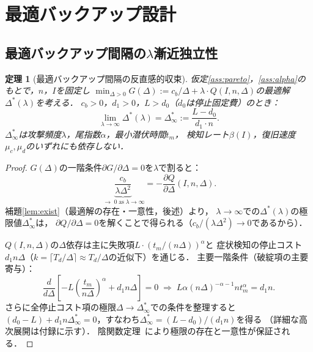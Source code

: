\documentclass[12pt,a4paper]{article}
\theoremstyle{plain}
\newtheorem{theorem}{定理}[section]
\theoremstyle{definition}
\theoremstyle{remark}
\newcommand{\betaI}{\beta(I)}
\newcommand{\Dopt}{\Delta^{*}}
\newcommand{\Dinf}{\Delta^{*}_{\infty}}
\begin{document}
\section{最適バックアップ設計}
\label{sec:opt}

\subsection{最適バックアップ間隔の$\lambda$漸近独立性}

\begin{theorem}[最適バックアップ間隔の反直感的収束]\label{thm:delta_inf}
仮定\ref{ass:pareto}，\ref{ass:alpha}のもとで，$n$，$I$を固定し
$\min_{\Delta>0}G(\Delta):=c_b/\Delta+\lambda\cdot Q(I,n,\Delta)$の最適解$\Dopt(\lambda)$を考える．
$c_b>0$，$d_1>0$，$L>d_0$（$d_0$は停止固定費）のとき：
\begin{equation}\label{eq:delta_inf}
  \lim_{\lambda\to\infty}\Dopt(\lambda)
  = \Dinf
  := \frac{L-d_0}{d_1\cdot n}.
\end{equation}
$\Dinf$は攻撃頻度$\lambda$，尾指数$\alpha$，最小潜伏時間$t_m$，
検知レート$\betaI$，復旧速度$\mu_c,\mu_d$のいずれにも依存しない．
\end{theorem}

\begin{proof}
$G(\Delta)$の一階条件$\partial G/\partial\Delta=0$を$\lambda$で割ると：
\begin{equation}\label{eq:foc_scaled}
  \underbrace{\frac{c_b}{\lambda\Delta^2}}_{\;\to\;0\;\text{as}\;\lambda\to\infty}
  = -\frac{\partial Q}{\partial\Delta}(I,n,\Delta).
\end{equation}
補題\ref{lem:exist}（最適解の存在・一意性，後述）より，
$\lambda\to\infty$での$\Dopt(\lambda)$の極限値$\Dinf$は，
$\partial Q/\partial\Delta=0$を解くことで得られる（$c_b/(\lambda\Delta^2)\to0$であるから）．

$Q(I,n,\Delta)$の$\Delta$依存は主に失敗項$L\cdot(t_m/(n\Delta))^\alpha$と
症状検知の停止コスト$d_1 n\Delta$（$k=\lceil T_d/\Delta\rceil\approx T_d/\Delta$の近似下）を通じる．
主要一階条件（破綻項の主要寄与）：
\[
  \frac{d}{d\Delta}\!\left[-L\left(\frac{t_m}{n\Delta}\right)^\alpha + d_1 n\Delta\right]=0
  \;\Longrightarrow\;
  L\alpha(n\Delta)^{-\alpha-1}n t_m^\alpha = d_1 n.
\]
さらに全停止コスト項の極限$\Delta\to\Dinf$での条件を整理すると
$(d_0-L)+d_1 n\Dinf=0$，すなわち$\Dinf=(L-d_0)/(d_1 n)$を得る
（詳細な高次展開は付録に示す）．
陰関数定理~\cite{rudin1976}により極限の存在と一意性が保証される．
\end{proof}
\end{document}

